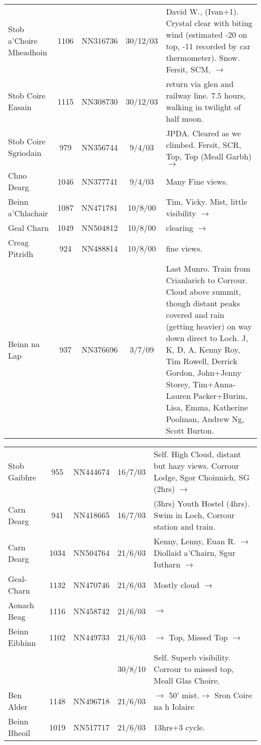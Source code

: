 \documentclass[10pt,a4paper]{article}
\begin{document}
\begin{tabular}{lcccp{6cm}}
Stob a'Choire Mheadhoin & 1106 & NN316736 &30/12/03& David W.,
(Ivan+1). Crystal clear with biting wind (estimated -20 on top,
-11 recorded by car thermometer). Snow. Fersit, SCM,
$\rightarrow$  \\
Stob Coire Easain  & 1115 & NN308730&30/12/03&  return via glen
and railway line. $7.5$ hours, walking in
twilight of half moon. \\
Stob Coire Sgriodain & 979  & NN356744 &9/4/03& JPDA. Cleared as
we climbed.
Fersit, SCR, Top, Top (Meall Garbh) $\rightarrow$   \\
Chno Dearg  & 1046  & NN377741 &9/4/03& Many Fine views. \\
Beinn a'Chlachair & 1087 & NN471781 &10/8/00& Tim, Vicky. Mist, little visibility $\rightarrow$\\
Geal Charn  & 1049  & NN504812 &10/8/00& clearing $\rightarrow$\\
Creag Pitridh & 924 & NN488814 &10/8/00& fine views.\\
Beinn na Lap & 937  & NN376696 &3/7/09& Last Munro. Train from Crianlarich to Corrour. Cloud above summit, though
distant peaks covered and rain (getting heavier) on way down direct to Loch. J, K, D, A, Kenny Roy, Tim Rowell,
Derrick Gordon, John+Jenny Storey, Tim+Anna-Lauren Packer+Burim, Lisa, Emma,
Katherine Poolman, Andrew Ng, Scott Burton.
\end{tabular}

\begin{tabular}{p{3.9cm}cccp{6cm}}
Stob Gaibhre & 955 & NN444674&16/7/03&Self. High Cloud, distant but hazy views.
Corrour Lodge, Sgor Choinnich, SG (2hrs) $\rightarrow$\\
Carn Dearg & 941  & NN418665&16/7/03& (3hrs) Youth Hostel (4hrs). Swim in Loch,
Corrour station and train. \\
Carn Dearg & 1034 & NN504764 &21/6/03&Kenny, Lenny, Euan R.
$\rightarrow$ Diollaid a'Chairn, Sgur Iutharn $\rightarrow$ \\
Geal-Charn  & 1132  & NN470746 &21/6/03& Mostly cloud $\rightarrow$ \\
Aonach Beag & 1116 & NN458742 &21/6/03&$\rightarrow$\\
Beinn Eibhinn & 1102 & NN449733 &21/6/03&$\rightarrow$ Top, Missed Top $\rightarrow$\\
&&&30/8/10&Self. Superb visibility. Corrour to missed top, Meall Glas Choire.\\
Ben Alder  & 1148  & NN496718 &21/6/03& $\rightarrow$ 50' mist.$\rightarrow$ Sron Coire na h Iolaire\\
Beinn Bheoil  & 1019 & NN517717 &21/6/03& 13hrs+3 cycle.\\
\end{tabular}
\end{document}
